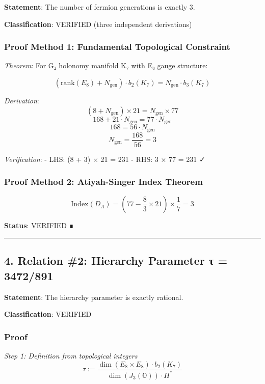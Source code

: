 \documentclass[11pt,a4paper]{article}
\begin{document}
\textbf{Statement}: The number of fermion generations is exactly 3.

\textbf{Classification}: VERIFIED (three independent derivations)

\subsubsection{Proof Method 1: Fundamental Topological Constraint}\label{proof-method-1-fundamental-topological-constraint}

\emph{Theorem}: For G₂ holonomy manifold K₇ with E₈ gauge structure:

\[(\text{rank}(E_8) + N_{\text{gen}}) \cdot b_2(K_7) = N_{\text{gen}} \cdot b_3(K_7)\]

\emph{Derivation}:
\[(8 + N_{\text{gen}}) \times 21 = N_{\text{gen}} \times 77\]
\[168 + 21 \cdot N_{\text{gen}} = 77 \cdot N_{\text{gen}}\]
\[168 = 56 \cdot N_{\text{gen}}\]
\[N_{\text{gen}} = \frac{168}{56} = 3\]

\emph{Verification}:
- LHS: (8 + 3) × 21 = 231
- RHS: 3 × 77 = 231 ✓

\subsubsection{Proof Method 2: Atiyah-Singer Index Theorem}\label{proof-method-2-atiyah-singer-index-theorem}

\[\text{Index}(D_A) = \left( 77 - \frac{8}{3} \times 21 \right) \times \frac{1}{7} = 3\]

\textbf{Status}: VERIFIED ∎

\begin{center}\rule{0.5\linewidth}{0.5pt}\end{center}

\subsection{4. Relation \#2: Hierarchy Parameter τ = 3472/891}\label{relation-2-hierarchy-parameter-ux3c4-3472891}

\textbf{Statement}: The hierarchy parameter is exactly rational.

\textbf{Classification}: VERIFIED

\subsubsection{Proof}\label{proof}

\emph{Step 1: Definition from topological integers}
\[\tau := \frac{\dim(E_8 \times E_8) \cdot b_2(K_7)}{\dim(J_3(\mathbb{O})) \cdot H^*}\]
\end{document}
